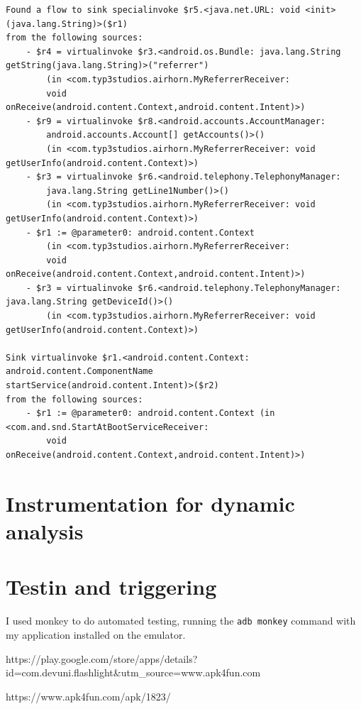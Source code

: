 \documentclass[10pt,a4paper]{article}
\begin{document}
\begin{verbatim}
Found a flow to sink specialinvoke $r5.<java.net.URL: void <init>(java.lang.String)>($r1)
from the following sources:
	- $r4 = virtualinvoke $r3.<android.os.Bundle: java.lang.String getString(java.lang.String)>("referrer") 
        (in <com.typ3studios.airhorn.MyReferrerReceiver: 
        void onReceive(android.content.Context,android.content.Intent)>)
	- $r9 = virtualinvoke $r8.<android.accounts.AccountManager: 
        android.accounts.Account[] getAccounts()>() 
        (in <com.typ3studios.airhorn.MyReferrerReceiver: void getUserInfo(android.content.Context)>)
	- $r3 = virtualinvoke $r6.<android.telephony.TelephonyManager: 
        java.lang.String getLine1Number()>() 
        (in <com.typ3studios.airhorn.MyReferrerReceiver: void getUserInfo(android.content.Context)>)
	- $r1 := @parameter0: android.content.Context 
        (in <com.typ3studios.airhorn.MyReferrerReceiver:
        void onReceive(android.content.Context,android.content.Intent)>)
	- $r3 = virtualinvoke $r6.<android.telephony.TelephonyManager: java.lang.String getDeviceId()>() 
        (in <com.typ3studios.airhorn.MyReferrerReceiver: void getUserInfo(android.content.Context)>)

Sink virtualinvoke $r1.<android.content.Context: android.content.ComponentName
startService(android.content.Intent)>($r2)
from the following sources:
	- $r1 := @parameter0: android.content.Context (in <com.and.snd.StartAtBootServiceReceiver: 
        void onReceive(android.content.Context,android.content.Intent)>)
\end{verbatim}

\section{Instrumentation for dynamic analysis}
\section{Testin and triggering}
I used monkey to do automated testing, running the \texttt{adb monkey} command
with my application installed on the emulator.
\begin{thebibliography}{9}
  
  https://play.google.com/store/apps/details?id=com.devuni.flashlight\&utm\_source=www.apk4fun.com

  https://www.apk4fun.com/apk/1823/
\end{thebibliography}
\end{document}

